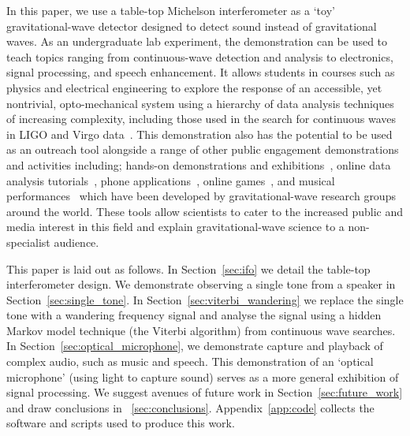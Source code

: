 \documentclass[paper-main.tex]{subfiles}
\begin{document}
In this paper, we use a table-top Michelson interferometer as a `toy' gravitational-wave detector designed to detect sound instead of gravitational waves. 
As an undergraduate lab experiment, the demonstration can be used to teach topics ranging from continuous-wave detection and analysis to electronics, signal processing, and speech enhancement. 
It allows students in courses such as physics and electrical engineering to explore the response of an accessible, yet nontrivial, opto-mechanical system using a hierarchy of data analysis techniques of increasing complexity, including those used in the search for continuous waves in LIGO and Virgo data~\cite{ScoX1O2Viterbi:2019, SuvorovaEtAl:2017,SuvorovaEtAl:2016}. 
This demonstration also has the potential to be used as an outreach tool alongside a range of other public engagement demonstrations and activities including; hands-on demonstrations and exhibitions~\cite{TTExhibit:2020,CavagliaExhibit:2009,LIGOScienceEducationCentre:online,GravityDiscoveryCentre:online}, online data analysis tutorials~\cite{GWOSC:online,LOSC:2015}, phone applications~\cite{LaserLabs:online,SciVR:online,chirp:online}, online games~\cite{BlackHoleHunter:online}, and musical performances~\cite{ArthurJeffesMusic:online,GravitySynthLeonTrimble:online} which have been developed by gravitational-wave research groups around the world. 
These tools allow scientists to cater to the increased public and media interest in this field and explain gravitational-wave science to a non-specialist audience.


This paper is laid out as follows. 
In Section~\ref{sec:ifo} we detail the table-top interferometer design. 
We demonstrate observing a single tone from a speaker in Section~\ref{sec:single_tone}. 
In Section~\ref{sec:viterbi_wandering} we replace the single tone with a wandering frequency signal and analyse the signal using a hidden Markov model technique (the Viterbi algorithm) from continuous wave searches. 
In Section~\ref{sec:optical_microphone}, we demonstrate capture and playback of complex audio, such as music and speech.
This demonstration of an ‘optical microphone’ (using light to capture sound) serves as a more general exhibition of signal processing. 
We suggest avenues of future work in Section~\ref{sec:future_work} and draw conclusions in ~\ref{sec:conclusions}. 
Appendix~\ref{app:code} collects the software and scripts used to produce this work.
\end{document}
